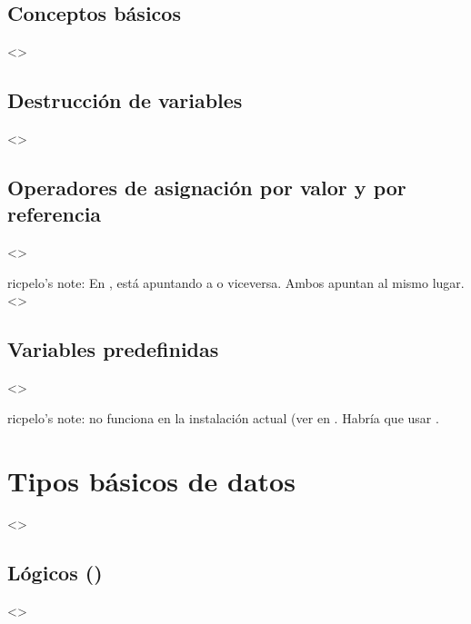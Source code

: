 \documentclass[a4paper,12pt,spanish]{sphinxmanual}
\begin{document}
\subsection{Conceptos básicos}
\label{\detokenize{php:conceptos-basicos}}
\textless{}\textgreater{}


\subsection{Destrucción de variables}
\label{\detokenize{php:destruccion-de-variables}}
\textless{}\textgreater{}


\subsection{Operadores de asignación por valor y por referencia}
\label{\detokenize{php:operadores-de-asignacion-por-valor-y-por-referencia}}
\textless{}\textgreater{}

ricpelo’s note: En ,   está apuntando a 
o viceversa. Ambos apuntan al mismo
lugar. \textless{}\textgreater{}


\subsection{Variables predefinidas}
\label{\detokenize{php:variables-predefinidas}}
\textless{}\textgreater{}

ricpelo’s note:  no funciona en la instalación actual (ver
 en . Habría que usar .


\section{Tipos básicos de datos}
\label{\detokenize{php:tipos-basicos-de-datos}}
\textless{}\textgreater{}


\subsection{Lógicos ()}
\label{\detokenize{php:logicos-bool}}
\textless{}\textgreater{}
\end{document}
